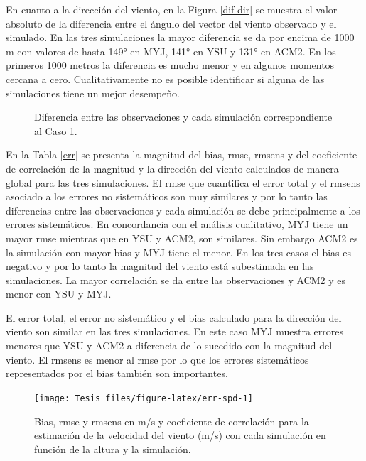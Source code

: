 \documentclass[12pt,spanish,oneside]{book}
\begin{document}
En cuanto a la dirección del viento, en la Figura \ref{dif-dir} se
muestra el valor absoluto de la diferencia entre el ángulo del vector
del viento observado y el simulado. En las tres simulaciones la mayor
diferencia se da por encima de 1000 m con valores de hasta 149° en MYJ,
141° en YSU y 131° en ACM2. En los primeros 1000 metros la diferencia es
mucho menor y en algunos momentos cercana a cero. Cualitativamente no es
posible identificar si alguna de las simulaciones tiene un mejor
desempeño.

\begin{figure}
\caption{Diferencia entre las observaciones y cada simulación  correspondiente al Caso 1. \label{dif}}\label{fig:diferencia}
\end{figure}

En la Tabla \ref{err} se presenta la magnitud del bias, rmse, rmsens y
del coeficiente de correlación de la magnitud y la dirección del viento
calculados de manera global para las tres simulaciones. El rmse que
cuantifica el error total y el rmsens asociado a los errores no
sistemáticos son muy similares y por lo tanto las diferencias entre las
observaciones y cada simulación se debe principalmente a los errores
sistemáticos. En concordancia con el análisis cualitativo, MYJ tiene un
mayor rmse mientras que en YSU y ACM2, son similares. Sin embargo ACM2
es la simulación con mayor bias y MYJ tiene el menor. En los tres casos
el bias es negativo y por lo tanto la magnitud del viento está
subestimada en las simulaciones. La mayor correlación se da entre las
observaciones y ACM2 y es menor con YSU y MYJ.

El error total, el error no sistemático y el bias calculado para la
dirección del viento son similar en las tres simulaciones. En este caso
MYJ muestra errores menores que YSU y ACM2 a diferencia de lo sucedido
con la magnitud del viento. El rmsens es menor al rmse por lo que los
errores sistemáticos representados por el bias también son importantes.

\begin{figure}

{\centering \texttt{[image: Tesis\_files/figure-latex/err-spd-1]} 

}

\caption{Bias, rmse y rmsens en m/s y coeficiente de correlación para la estimación de la velocidad del viento (m/s) con cada simulación en función de la altura y la simulación. \label{err-spd}}\label{fig:err-spd}
\end{figure}
\end{document}
